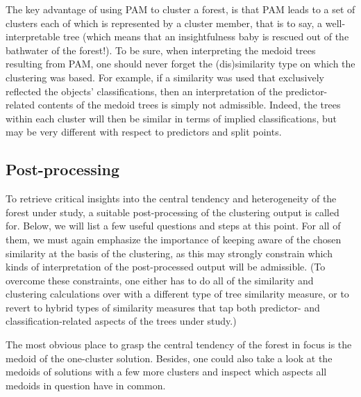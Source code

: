 The key advantage of using PAM to cluster a forest, is that PAM leads to a set of clusters each of which is represented by a cluster member, that is to say, a well-interpretable tree (which means that an insightfulness baby is rescued out of the bathwater of the forest!). To be sure, when interpreting the medoid trees resulting from PAM, one should never forget the (dis)similarity type on which the clustering was based. For example, if a similarity was used that exclusively reflected the objects' classifications, then an interpretation of the predictor-related contents of the medoid trees is simply not admissible. Indeed, the trees within each cluster will then be similar in terms of implied classifications, but may be very different with respect to predictors and split points.



\subsection{Post-processing}
To retrieve critical insights into the central tendency and heterogeneity of the forest under study, a suitable post-processing of the clustering output is called for. Below, we will list a few useful questions and steps at this point. For all of them, we must again emphasize the importance of keeping aware of the chosen similarity at the basis of the clustering, as this may strongly constrain which kinds of interpretation of the post-processed output will be admissible. (To overcome these constraints, one either has to do all of the similarity and clustering calculations over with a different type of tree similarity measure, or to revert to hybrid types of similarity measures that tap both predictor- and classification-related aspects of the trees under study.)

The most obvious place to grasp the central tendency of the forest in focus is the medoid of the one-cluster solution. Besides, one could also take a look at the medoids of solutions with a few more clusters and inspect which aspects all medoids in question have in common. 

